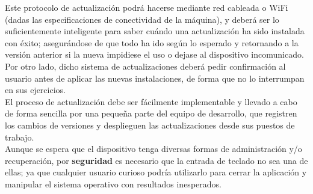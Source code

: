 Este protocolo de actualización podrá hacerse mediante red cableada o WiFi (dadas las especificaciones de conectividad de la máquina), y deberá ser lo suficientemente inteligente para saber cuándo una actualización ha sido instalada con éxito; asegurándose de que todo ha ido según lo esperado y retornando a la versión anterior si la nueva impidiese el uso o dejase al dispositivo incomunicado. Por otro lado, dicho sistema de actualizaciones deberá pedir confirmación al usuario antes de aplicar las nuevas instalaciones, de forma que no lo interrumpan en sus ejercicios.\\

El proceso de actualización debe ser fácilmente implementable y llevado a cabo de forma sencilla por una pequeña parte del equipo de desarrollo, que registren los cambios de versiones y desplieguen las actualizaciones desde sus puestos de trabajo.\\

Aunque se espera que el dispositivo tenga diversas formas de administración y/o recuperación, por \textbf{seguridad} es necesario que la entrada de teclado no sea una de ellas; ya que cualquier usuario curioso podría utilizarlo para cerrar la aplicación y manipular el sistema operativo con resultados inesperados.\\

\newpage